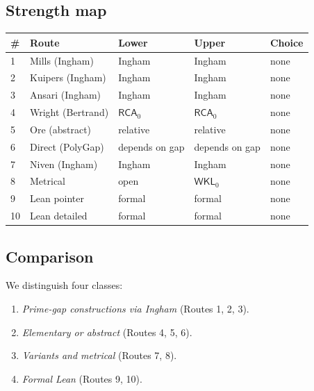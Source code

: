 \documentclass[11pt,reqno]{amsart}
\theoremstyle{redplain}
\numberwithin{equation}{section}
\begin{document}
\subsection{Strength map}

\begin{center}
{\small
\begin{tabular}{|m{0.6cm}|m{4.6cm}|m{1.4cm}|m{1.4cm}|m{1.4cm}|}
\hline
\textbf{\#} & \textbf{Route} & \textbf{Lower} & \textbf{Upper} & \textbf{Choice}\\
\hline
1  & Mills (Ingham)        & Ingham              & Ingham              & none \\
\hline
2  & Kuipers (Ingham)      & Ingham              & Ingham              & none \\
\hline
3  & Ansari (Ingham)       & Ingham              & Ingham              & none \\
\hline
4  & Wright (Bertrand)     & $\mathsf{RCA}_0$    & $\mathsf{RCA}_0$    & none \\
\hline
5  & Ore (abstract)        & relative            & relative            & none \\
\hline
6  & Direct (PolyGap)      & depends on gap      & depends on gap      & none \\
\hline
7  & Niven (Ingham)        & Ingham              & Ingham              & none \\
\hline
8  & Metrical              & open                & $\mathsf{WKL}_0$    & none \\
\hline
9  & Lean pointer          & formal              & formal              & none \\
\hline
10 & Lean detailed         & formal              & formal              & none \\
\hline
\end{tabular}
}
\end{center}

\subsection{Comparison}
\label{sec:compare}

\noindent We distinguish four classes:
\begin{enumerate}
\item \emph{Prime-gap constructions via Ingham} (Routes 1, 2, 3).
\item \emph{Elementary or abstract} (Routes 4, 5, 6).
\item \emph{Variants and metrical} (Routes 7, 8).
\item \emph{Formal Lean} (Routes 9, 10).
\end{enumerate}
\end{document}
